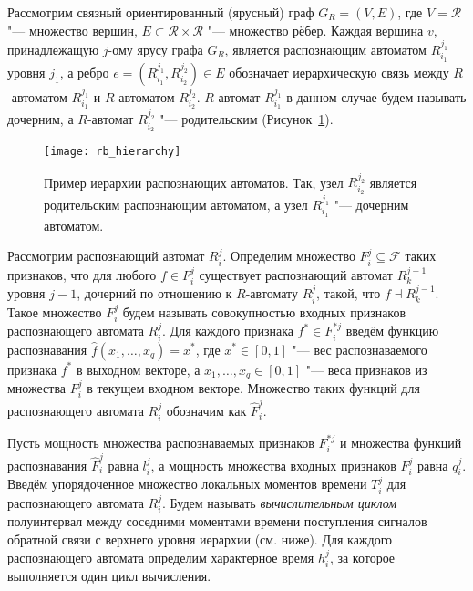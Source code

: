 Рассмотрим связный ориентированный (ярусный) граф $G_R=(V,E)$, где $V=\mathcal R$ "--- множество вершин, $E\subset \mathcal R\times \mathcal R$ "--- множество рёбер. Каждая вершина $v$, принадлежащую $j$-ому ярусу графа $G_R$, является распознающим автоматом $R_{i_1}^{j_1}$ уровня $j_1$, а ребро $e=(R_{i_1}^{j_1},R_{i_2}^{j_2}){\in}E$ обозначает  иерархическую связь между $R$-автоматом $R_{i_1}^{j_1}$ и $R$-автоматом $R_{i_2}^{j_2}$. $R$-автомат $R_{i_1}^{j_1 }$ в данном случае будем называть дочерним, а $R$-автомат $R_{i_2}^{j_2}$ "--- родительским (Рисунок~\ref{fg:rb_hier}).

\begin{figure}[h]
	\centering
	\texttt{[image: rb\_hierarchy]}
	\caption{Пример иерархии распознающих автоматов. Так, узел $R_{i_2}^{j_2}$ является родительским распознающим автоматом, а узел $R_{i_1}^{j_1}$ "--- дочерним автоматом.}
	\label{fg:rb_hier}
\end{figure}

Рассмотрим распознающий автомат $R_i^j$. Определим множество $F_i^j{\subseteq}\mathcal F$ таких признаков, что для любого $f{\in}F_i^j$ существует распознающий автомат $R_k^{j-1}$ уровня $j-1$, дочерний по отношению к $R$-автомату $R_i^j$, такой, что $f{\dashv}R_k^{j-1}$. Такое множество $F_i^j$ будем называть совокупностью входных признаков распознающего автомата $R_i^j$. Для каждого признака $f^*{\in}F_i^{*j}$ введём функцию распознавания $\hat{f}(x_1,\dots,x_q )=x^*$, где $x^*{\in}[0,1]$ "--- вес распознаваемого признака $f^*$ в выходном векторе, а $x_1,\dots,x_q{\in}[0,1]$ "--- веса признаков из множества $F_i^j$ в текущем входном векторе. Множество таких функций для распознающего автомата $R_i^j$ обозначим как $\hat{F}_i^j$.

Пусть мощность множества распознаваемых признаков $F_i^{*j}$ и множества функций распознавания $\hat{F}_i^j$ равна $l_i^j$, а мощность множества входных признаков $F_i^j$ равна $q_i^j$. Введём упорядоченное множество локальных моментов времени $T_i^j$ для распознающего автомата $R_i^j$. Будем называть \textit{вычислительным циклом} полуинтервал между соседними моментами времени поступления сигналов обратной связи с верхнего уровня иерархии (см. ниже). Для каждого распознающего автомата определим характерное время $h_i^j$, за которое выполняется один цикл вычисления. 

